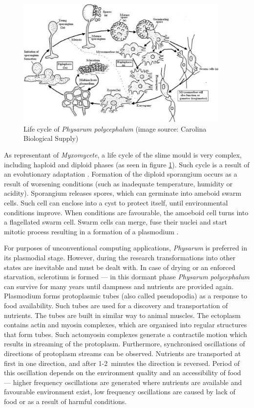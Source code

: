 \documentclass[english,a4paper,twoside]{ppfcmthesis}
\begin{document}
\begin{figure}
  \centering
  \includegraphics[width=0.94\textwidth]{background/physarum/lifecycle.png}
  \caption{Life cycle of \textit{Physarum polycephalum} (image source: Carolina Biological Supply)}
  \label{figure:bp_lifecycle}
\end{figure}

As representant of \textit{Myxomycete}, a life cycle of the slime mould is very complex, including haploid and diploid phases (as seen in figure \ref{figure:bp_lifecycle}). Such cycle is a result of an evolutionary adaptation \cite{stephenson1994myxomycetes}. Formation of the diploid sporangium occurs as a result of worsening conditions (such as inadequate temperature, humidity or acidity). Sporangium releases spores, which can germinate into ameboid swarm cells. Such cell can enclose into a cyst to protect itself, until environmental conditions improve. When conditions are favourable, the amoeboid cell turns into a flagellated swarm cell. Swarm cells can merge, fuse their nuclei and start mitotic process resulting in a formation of a plasmodium \cite{jones2015pattern}.

For purposes of unconventional computing applications, \textit{Physarum} is preferred in its plasmodial stage. However, during the research transformations into other states are inevitable and must be dealt with. In case of drying or an enforced starvation, sclerotium is formed --- in this dormant phase \textit{Physarum polycephalum} can survive for many years until dampness and nutrients are provided again. Plasmodium forms protoplasmic tubes (also called pseudopodia) as a response to food availability. Such tubes are used for a discovery and transportation of nutrients. The tubes are built in similar way to animal muscles. The ectoplasm contains actin and myosin complexes, which are organised into regular structures that form tubes. Such actomyosin complexes generate a contractile motion which results in streaming of the protoplasm. Furthermore, synchronised oscillations of directions of protoplasm streams can be observed. Nutrients are transported at first in one direction, and after 1-2~minutes the direction is reversed. Period of this oscillation depends on the environment quality and an accessibility of food \cite{wohlfarth1979oscillatory} --- higher frequency oscillations are generated where nutrients are available and favourable environment exist, low frequency oscillations are caused by lack of food or as a result of harmful conditions. 
\end{document}
